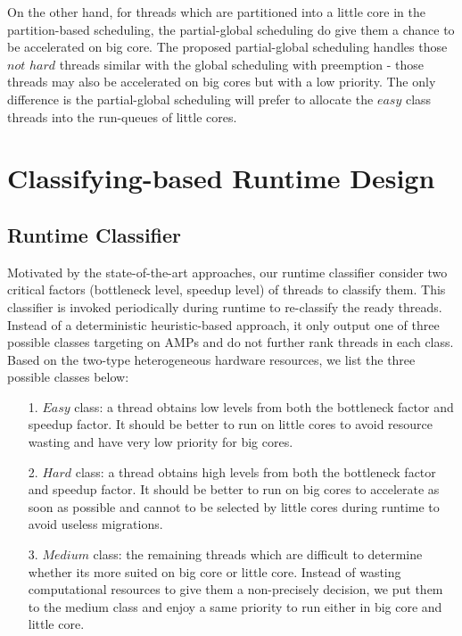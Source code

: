 \documentclass[pageno]{jpaper}
\begin{document}
On the other hand, for threads which are partitioned into a little core in the partition-based scheduling, the partial-global scheduling do give them a chance to be accelerated on big core. The proposed partial-global scheduling handles those $not$ $hard$ threads similar with the global scheduling with preemption - those threads may also be accelerated on big cores but with a low priority. The only difference is the partial-global scheduling will prefer to allocate the $easy$ class threads into the run-queues of little cores. 






\section{Classifying-based Runtime Design}
\subsection{Runtime Classifier}
Motivated by the state-of-the-art approaches, our runtime classifier consider two critical factors (bottleneck level, speedup level) of threads to classify them. This classifier is invoked periodically during runtime to re-classify the ready threads. Instead of a deterministic heuristic-based approach, it only output one of three possible classes targeting on AMPs and do not further rank threads in each class. Based on the two-type heterogeneous hardware resources,  we list the three possible classes below:
\begin{itemize}
\item[1.] $Easy$ class: a thread obtains low levels from both the bottleneck factor and speedup factor. It should be better to run on little cores to avoid resource wasting and have very low priority for big cores.
\item[2.] $Hard$ class: a thread obtains high levels from both the bottleneck factor and speedup factor. It should be better to run on big cores to accelerate as soon as possible and cannot to be selected by little cores during runtime to avoid useless migrations.
\item[3.] $Medium$ class: the remaining threads which are difficult to determine whether its more suited on big core or little core. Instead of wasting computational resources to give them a non-precisely decision, we put them to the medium class and enjoy a same priority to run either in big core and little core. 
\end{itemize}
\end{document}

